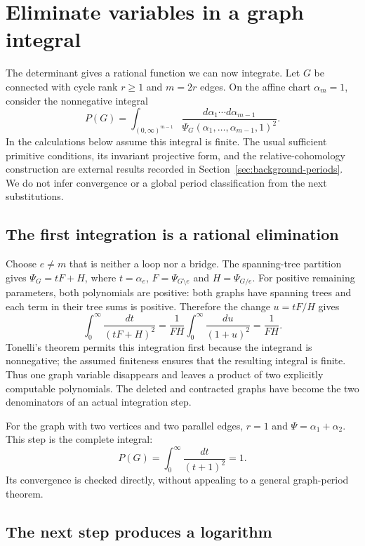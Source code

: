 \documentclass[11pt]{article}
\theoremstyle{definition}
\theoremstyle{remark}
\begin{document}
\section{Eliminate variables in a graph integral}
\label{sec:graph-period-families}

The determinant gives a rational function we can now integrate. Let $G$ be connected with cycle rank $r\ge1$ and $m=2r$ edges. On the affine chart $\alpha_m=1$, consider the nonnegative integral
\[
 P(G)=\int_{(0,\infty)^{m-1}}
           \frac{d\alpha_1\cdots d\alpha_{m-1}}{\Psi_G(\alpha_1,\ldots,\alpha_{m-1},1)^2}.
\]
In the calculations below assume this integral is finite. The usual sufficient primitive conditions, its invariant projective form, and the relative-cohomology construction are external results recorded in Section~\ref{sec:background-periods}. We do not infer convergence or a global period classification from the next substitutions.

\subsection{The first integration is a rational elimination}
\label{sec:direct-period-elimination}

Choose $e\ne m$ that is neither a loop nor a bridge. The spanning-tree partition gives $\Psi_G=tF+H$, where $t=\alpha_e$, $F=\Psi_{G\setminus e}$ and $H=\Psi_{G/e}$. For positive remaining parameters, both polynomials are positive: both graphs have spanning trees and each term in their tree sums is positive. Therefore the change $u=tF/H$ gives
\[
 \int_0^\infty\frac{dt}{(tF+H)^2}
   =\frac1{FH}\int_0^\infty\frac{du}{(1+u)^2}
   =\frac1{FH}.
\]
Tonelli's theorem permits this integration first because the integrand is nonnegative; the assumed finiteness ensures that the resulting integral is finite. Thus one graph variable disappears and leaves a product of two explicitly computable polynomials. The deleted and contracted graphs have become the two denominators of an actual integration step.

For the graph with two vertices and two parallel edges, $r=1$ and $\Psi=\alpha_1+\alpha_2$. This step is the complete integral:
\[
 P(G)=\int_0^\infty\frac{dt}{(t+1)^2}=1.
\]
Its convergence is checked directly, without appealing to a general graph-period theorem.

\subsection{The next step produces a logarithm}
\label{sec:two-denominator-elimination}
\end{document}
